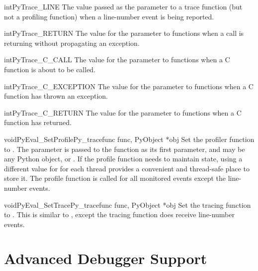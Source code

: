 \begin{cvardesc}{int}{PyTrace_LINE}
  The value passed as the  parameter to a trace function
  (but not a profiling function) when a line-number event is being
  reported.
\end{cvardesc}

\begin{cvardesc}{int}{PyTrace_RETURN}
  The value for the  parameter to 
  functions when a call is returning without propagating an exception.
\end{cvardesc}

\begin{cvardesc}{int}{PyTrace_C_CALL}
  The value for the  parameter to 
  functions when a C function is about to be called.
\end{cvardesc}

\begin{cvardesc}{int}{PyTrace_C_EXCEPTION}
  The value for the  parameter to 
  functions when a C function has thrown an exception.
\end{cvardesc}

\begin{cvardesc}{int}{PyTrace_C_RETURN}
  The value for the  parameter to 
  functions when a C function has returned.
\end{cvardesc}

\begin{cfuncdesc}{void}{PyEval_SetProfile}{Py_tracefunc func, PyObject *obj}
  Set the profiler function to .  The  parameter is
  passed to the function as its first parameter, and may be any Python
  object, or \NULL.  If the profile function needs to maintain state,
  using a different value for  for each thread provides a
  convenient and thread-safe place to store it.  The profile function
  is called for all monitored events except the line-number events.
\end{cfuncdesc}

\begin{cfuncdesc}{void}{PyEval_SetTrace}{Py_tracefunc func, PyObject *obj}
  Set the tracing function to .  This is similar to
  , except the tracing function does
  receive line-number events.
\end{cfuncdesc}


\section{Advanced Debugger Support \label{advanced-debugging}}

